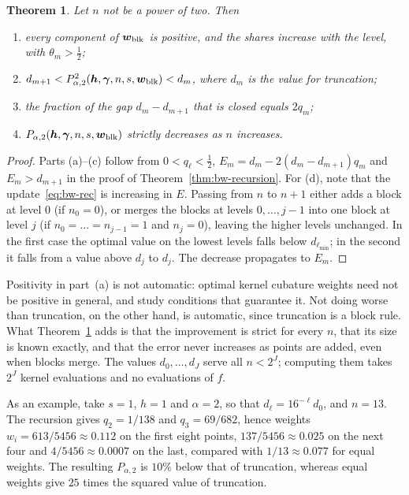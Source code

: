 \documentclass[preprint,12pt,authoryear]{elsarticle}
\newtheorem{theorem}{Theorem}
\begin{document}
\begin{theorem}\label{thm:bw-guarantees}
Let $n$ not be a power of two. Then
\begin{enumerate}[label=(\alph*)]
\item every component of $\boldsymbol w_{\rm blk}$ is positive, and the
  shares increase with the level, with $\theta_m>\tfrac12$;
\item $d_{m+1}<P_{\alpha,2}^2(\boldsymbol h,\boldsymbol\gamma,n,s,
  \boldsymbol w_{\rm blk})<d_m$, where $d_m$ is the value for truncation;
\item the fraction of the gap $d_m-d_{m+1}$ that is closed equals $2q_m$;
\item $P_{\alpha,2}(\boldsymbol h,\boldsymbol\gamma,n,s,\boldsymbol w_{\rm blk})$
  strictly decreases as $n$ increases.
\end{enumerate}
\end{theorem}

\begin{proof}
Parts (a)--(c) follow from $0<q_\ell<\tfrac12$, $E_m=d_m-2(d_m-d_{m+1})q_m$
and $E_m>d_{m+1}$ in the proof of Theorem~\ref{thm:bw-recursion}. For (d),
note that the update~\eqref{eq:bw-rec} is increasing in $E$. Passing from
$n$ to $n+1$ either adds a block at level $0$ (if $n_0=0$), or merges the
blocks at levels $0,\dots,j-1$ into one block at level $j$ (if
$n_0=\dots=n_{j-1}=1$ and $n_j=0$), leaving the higher levels unchanged. In
the first case the optimal value on the lowest levels falls below
$d_{\ell_{\min}}$; in the second it falls from a value above $d_j$ to $d_j$.
The decrease propagates to $E_m$.
\end{proof}

Positivity in part~(a) is not automatic: optimal kernel cubature weights
need not be positive in general, and \citet{KKS19} study conditions that
guarantee it. Not doing worse than truncation, on the other hand, is
automatic, since truncation is a block rule. What
Theorem~\ref{thm:bw-guarantees} adds is that the improvement is strict for
every $n$, that its size is known exactly, and that the error never
increases as points are added, even when blocks merge. The values
$d_0,\dots,d_J$ serve all $n<2^J$; computing them takes $2^J$ kernel
evaluations and no evaluations of $f$.

As an example, take $s=1$, $h=1$ and $\alpha=2$, so that
$d_\ell=16^{-\ell}d_0$, and $n=13$. The recursion gives $q_2=1/138$ and
$q_3=69/682$, hence weights $w_i=613/5456\approx0.112$ on the first eight
points, $137/5456\approx0.025$ on the next four and $4/5456\approx0.0007$ on
the last, compared with $1/13\approx0.077$ for equal weights. The resulting
$P_{\alpha,2}$ is $10\%$ below that of truncation, whereas equal weights give
$25$ times the squared value of truncation.
\end{document}
